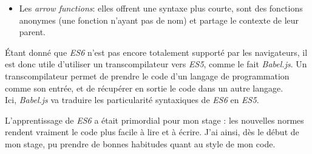 \begin{itemize}
\begin{Shaded}
\begin{Highlighting}[]
 \OperatorTok{\{} \OperatorTok{,} \OperatorTok{,} \OperatorTok{\}} \OperatorTok{=} \NormalTok{()}
 \OperatorTok{=} \NormalTok{()}\OperatorTok{;}
 \OperatorTok{=} \OperatorTok{;}
 \OperatorTok{=} \OperatorTok{;}
 \OperatorTok{=} \OperatorTok{;}
\end{Highlighting}
\end{Shaded}
\item
  Les \emph{arrow functions}: elles offrent une syntaxe plus courte,
  sont des fonctions anonymes (une fonction n'ayant pas de nom) et
  partage le contexte de leur parent.

\begin{Shaded}
\begin{Highlighting}[]
 \OperatorTok{=}  \OperatorTok{\{}  
   \OperatorTok{*} 
\OperatorTok{\}}
 \OperatorTok{=} \OperatorTok{=>} \OperatorTok{*}   
\end{Highlighting}
\end{Shaded}
\end{itemize}

\bigskip

Étant donné que \emph{ES6} n'est pas encore totalement supporté par les
navigateurs, il est donc utile d'utiliser un transcompilateur vers
\emph{ES5}, comme le fait \emph{Babel.js}. Un transcompilateur permet de
prendre le code d'un langage de programmation comme son entrée, et de
récupérer en sortie le code dans un autre langage.\\
Ici, \emph{Babel.js} va traduire les particularité syntaxiques de
\emph{ES6} en \emph{ES5}.

\bigskip

L'apprentissage de \emph{ES6} a était primordial pour mon stage : les
nouvelles normes rendent vraiment le code plus facile à lire et à
écrire. J'ai ainsi, dès le début de mon stage, pu prendre de bonnes
habitudes quant au style de mon code.


